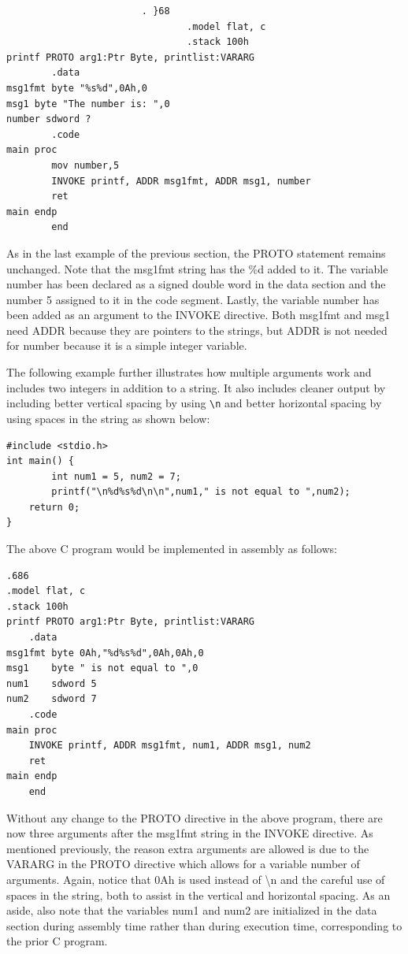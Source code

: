 \documentclass[10pt]{book}
\begin{document}
\begin{verbatim}
                        . }68
                                .model flat, c
                                .stack 100h
printf PROTO arg1:Ptr Byte, printlist:VARARG
        .data
msg1fmt byte "%s%d",0Ah,0
msg1 byte "The number is: ",0
number sdword ?
        .code
main proc
        mov number,5
        INVOKE printf, ADDR msg1fmt, ADDR msg1, number
        ret
main endp
        end
\end{verbatim}

As in the last example of the previous section, the PROTO statement remains unchanged. Note that the msg1fmt string has the \%d added to it. The variable number has been declared as a signed double word in the data section and the number 5 assigned to it in the code segment. Lastly, the variable number has been added as an argument to the INVOKE directive. Both msg1fmt and msg1 need ADDR because they are pointers to the strings, but ADDR is not needed for number because it is a simple integer variable.

The following example further illustrates how multiple arguments work and includes two integers in addition to a string. It also includes cleaner output by including better vertical spacing by using \verb|\n| and better horizontal spacing by using spaces in the string as shown below:

\begin{verbatim}
#include <stdio.h>
int main() {
        int num1 = 5, num2 = 7;
        printf("\n%d%s%d\n\n",num1," is not equal to ",num2);
    return 0;
}
\end{verbatim}

The above C program would be implemented in assembly as follows:
\begin{verbatim}
.686
.model flat, c
.stack 100h
printf PROTO arg1:Ptr Byte, printlist:VARARG
    .data
msg1fmt byte 0Ah,"%d%s%d",0Ah,0Ah,0
msg1    byte " is not equal to ",0
num1    sdword 5
num2    sdword 7
    .code
main proc
    INVOKE printf, ADDR msg1fmt, num1, ADDR msg1, num2
    ret
main endp
    end
\end{verbatim}

Without any change to the PROTO directive in the above program, there are now three arguments after the msg1fmt string in the INVOKE directive. As mentioned previously, the reason extra arguments are allowed is due to the VARARG in the PROTO directive which allows for a variable number of arguments. Again, notice that 0Ah is used instead of \textbackslash n and the careful use of spaces in the string, both to assist in the vertical and horizontal spacing. As an aside, also note that the variables num1 and num2 are initialized in the data section during assembly time rather than during execution time, corresponding to the prior C program.
\end{document}

